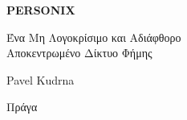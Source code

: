 \thispagestyle{empty}
\begin{center}
  {\sffamily\bfseries\fontsize{34}{40}\selectfont PERSONIX\par}
  \vspace{2.2em}
  {\rmfamily\large Ένα Μη Λογοκρίσιμο και Αδιάφθορο\\[0.25em]
   Αποκεντρωμένο Δίκτυο Φήμης\par}
\end{center}
\begin{center}
  {\rmfamily\Large Pavel Kudrna\par}
  \vspace{0.45em}
  {\rmfamily\small Πράγα\quad\textbullet{}\par}
\end{center}
\clearpage
